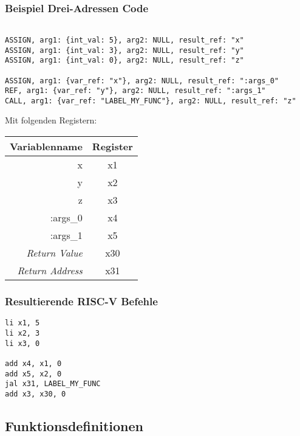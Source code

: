 \subsubsection{Beispiel Drei-Adressen Code}

\begin{lstlisting}[caption={Drei-Adressen Code Funktionsaufruf}]

ASSIGN, arg1: {int_val: 5}, arg2: NULL, result_ref: "x"
ASSIGN, arg1: {int_val: 3}, arg2: NULL, result_ref: "y"
ASSIGN, arg1: {int_val: 0}, arg2: NULL, result_ref: "z"

ASSIGN, arg1: {var_ref: "x"}, arg2: NULL, result_ref: ":args_0"
REF, arg1: {var_ref: "y"}, arg2: NULL, result_ref: ":args_1"
CALL, arg1: {var_ref: "LABEL_MY_FUNC"}, arg2: NULL, result_ref: "z"

\end{lstlisting}

Mit folgenden Registern:

\begin{table}[H]
  \begin{center}
    \begin{tabular}{| r | c |}
      \hline
      Variablenname & Register \\
      \hline
      x & x1 \\
      y & x2 \\
      z & x3 \\
      :args\_0 & x4 \\
      :args\_1 & x5 \\
      \textit{Return Value} & x30 \\
      \textit{Return Address} & x31 \\
      \hline
    \end{tabular}
  \end{center}
\end{table}

\subsubsection{Resultierende RISC-V Befehle}

\begin{lstlisting}
li x1, 5
li x2, 3
li x3, 0

add x4, x1, 0
add x5, x2, 0
jal x31, LABEL_MY_FUNC
add x3, x30, 0

\end{lstlisting}

\subsection{Funktionsdefinitionen}

